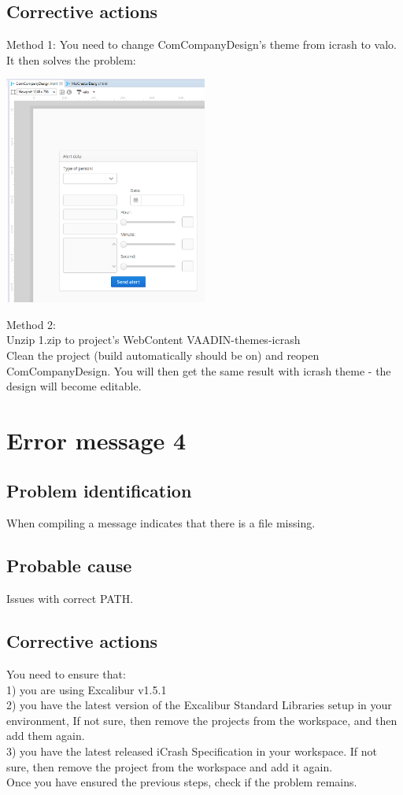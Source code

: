 \subsection{Corrective actions}
Method 1: 
You need to change ComCompanyDesign's theme from icrash to valo.
It then solves the problem:
\begin{center}
\includegraphics[width=0.5\textwidth]{./images/er3.eps}
\end{center}

Method 2:\\
Unzip 1.zip to project's WebContent VAADIN-themes-icrash\\
Clean the project (build automatically should be on) and reopen ComCompanyDesign.
You will then get the same result with icrash theme - the design will become editable.


\section{Error message 4}

\subsection{Problem identification}
When compiling a message indicates that there is a file missing.

\subsection{Probable cause}
Issues with correct PATH.

\subsection{Corrective actions}
You need to ensure that:\\
1) you are using Excalibur v1.5.1\\
2) you have the latest version of the Excalibur Standard Libraries setup in your
environment, If not sure, then remove the projects from the workspace, and then
add them again.\\ 3) you have the latest released iCrash Specification in your
workspace. If not sure, then remove the project from the workspace and add it
again. \\
Once you have ensured the previous steps, check if the problem remains.


